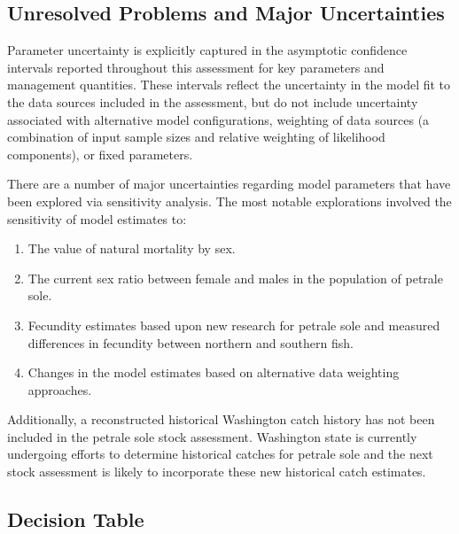 \documentclass[12pt,]{article}
\begin{document}
\FloatBarrier

\subsection*{Unresolved Problems and Major
Uncertainties}\label{unresolved-problems-and-major-uncertainties}

Parameter uncertainty is explicitly captured in the asymptotic
confidence intervals reported throughout this assessment for key
parameters and management quantities. These intervals reflect the
uncertainty in the model fit to the data sources included in the
assessment, but do not include uncertainty associated with alternative
model configurations, weighting of data sources (a combination of input
sample sizes and relative weighting of likelihood components), or fixed
parameters.

There are a number of major uncertainties regarding model parameters
that have been explored via sensitivity analysis. The most notable
explorations involved the sensitivity of model estimates to:

\begin{enumerate}

\item The value of natural mortality by sex.

\item The current sex ratio between female and males in the population of petrale sole.

\item Fecundity estimates based upon new research for petrale sole and measured differences in fecundity between northern and southern fish.

\item Changes in the model estimates based on alternative data weighting approaches.

\end{enumerate}

Additionally, a reconstructed historical Washington catch history has
not been included in the petrale sole stock assessment. Washington state
is currently undergoing efforts to determine historical catches for
petrale sole and the next stock assessment is likely to incorporate
these new historical catch estimates.

\subsection*{Decision Table}\label{decision-table}
\end{document}
